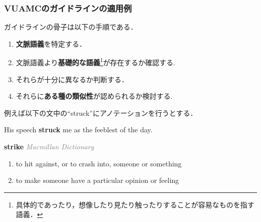 \documentclass[11pt]{beamer}
\newlength{\la}
\begin{document}
\begin{frame}
    \frametitle{VUAMCのガイドラインの適用例}
    \begingroup
    \footnotesize
    ガイドラインの骨子は以下の手順である．
    \begin{enumerate}
        \item \textbf{文脈語義}を特定する．
        \item 文脈語義より\textbf{基礎的な語義}\footnote[frame]{具体的であったり，想像したり見たり触ったりすることが容易なものを指す語義．}が存在するか確認する.
        \item それらが十分に異なるか判断する．
        \item それらに\textbf{ある種の類似性}が認められるか検討する.
    \end{enumerate}

    例えば以下の文中の“struck”にアノテーションを行うとする．
    \begin{center}
        His speech \textbf{struck} me as the feeblest of the day.
    \end{center}

    \begin{leftbar}
        \textbf{strike}  \hfill\textcolor{gray}{\emph{Macmillan Dictionary}}
        \vspace{-\topsep}
        \begin{enumerate}
            \item to hit against, or to crash into, someone or something
            \item to make someone have a particular opinion or feeling
        \end{enumerate}
    \end{leftbar}
    \endgroup
\end{frame}
\end{document}
